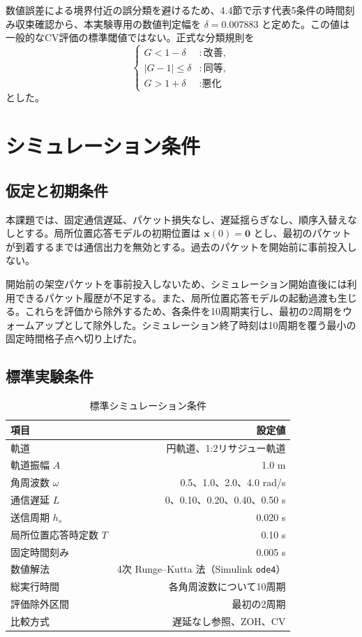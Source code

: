 \documentclass[11pt,a4paper]{article}
\newcommand{\code}[1]{\texttt{#1}}
\newcommand{\vect}[1]{\bm{#1}}
\begin{document}
数値誤差による境界付近の誤分類を避けるため、4.4節で示す代表5条件の時間刻み収束確認から、本実験専用の数値判定幅を $\delta=0.007883$ と定めた。この値は一般的なCV評価の標準閾値ではない。正式な分類規則を
\begin{equation}
\label{eq:classification-rule}
\begin{cases}
G<1-\delta & : \text{改善},\\
|G-1|\le\delta & : \text{同等},\\
G>1+\delta & : \text{悪化}
\end{cases}
\end{equation}
とした。

\section{シミュレーション条件}

\subsection{仮定と初期条件}

本課題では、固定通信遅延、パケット損失なし、遅延揺らぎなし、順序入替えなしとする。局所位置応答モデルの初期位置は $\vect x(0)=\vect 0$ とし、最初のパケットが到着するまでは通信出力を無効とする。過去のパケットを開始前に事前投入しない。

開始前の架空パケットを事前投入しないため、シミュレーション開始直後には利用できるパケット履歴が不足する。また、局所位置応答モデルの起動過渡も生じる。これらを評価から除外するため、各条件を10周期実行し、最初の2周期をウォームアップとして除外した。シミュレーション終了時刻は10周期を覆う最小の固定時間格子点へ切り上げた。

\subsection{標準実験条件}

\begin{table}[H]
\centering
\caption{標準シミュレーション条件}
\label{tab:conditions}
\begin{tabular}{lr}
\toprule
項目 & 設定値 \\
\midrule
軌道 & 円軌道、1:2リサジュー軌道 \\
軌道振幅 $A$ & 1.0 m \\
角周波数 $\omega$ & 0.5、1.0、2.0、4.0 rad/s \\
通信遅延 $L$ & 0、0.10、0.20、0.40、0.50 s \\
送信周期 $h_s$ & 0.020 s \\
局所位置応答時定数 $T$ & 0.10 s \\
固定時間刻み & 0.005 s \\
数値解法 & 4次 Runge--Kutta 法（Simulink \code{ode4}） \\
総実行時間 & 各角周波数について10周期 \\
評価除外区間 & 最初の2周期 \\
比較方式 & 遅延なし参照、ZOH、CV \\
\bottomrule
\end{tabular}
\end{table}
\end{document}

